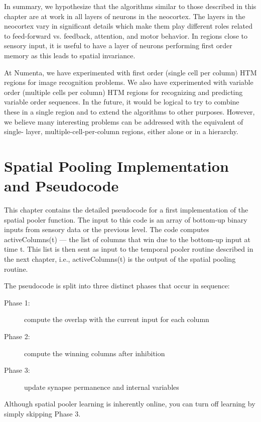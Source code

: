 \documentclass{report}
\begin{document}
In summary, we hypothesize that the algorithms similar to those
described in this chapter are at work in all layers of neurons in the
neocortex. The layers in the neocortex vary in significant details
which make them play different roles related to feed-forward
vs. feedback, attention, and motor behavior. In regions close to
sensory input, it is useful to have a layer of neurons performing
first order memory as this leads to spatial invariance.

At Numenta, we have experimented with first order (single cell per
column) HTM regions for image recognition problems. We also have
experimented with variable order (multiple cells per column) HTM
regions for recognizing and predicting variable order sequences. In
the future, it would be logical to try to combine these in a single
region and to extend the algorithms to other purposes. However, we
believe many interesting problems can be addressed with the equivalent
of single- layer, multiple-cell-per-column regions, either alone or in
a hierarchy.

\chapter{Spatial Pooling Implementation and Pseudocode}
\label{chapter:spatial-pooling}

This chapter contains the detailed pseudocode for a first
implementation of the spatial pooler function. The input to this code
is an array of bottom-up binary inputs from sensory data or the
previous level. The code computes activeColumns(t) --- the list of
columns that win due to the bottom-up input at time t. This list is
then sent as input to the temporal pooler routine described in the
next chapter, i.e., activeColumns(t) is the output of the spatial
pooling routine.

The pseudocode is split into three distinct phases that occur in
sequence:

\begin{description}
\item[Phase 1:] compute the overlap with the current input for each column
\item[Phase 2:] compute the winning columns after inhibition
\item[Phase 3:] update synapse permanence and internal variables
\end{description}

Although spatial pooler learning is inherently online, you can turn
off learning by simply skipping Phase 3.
\end{document}
